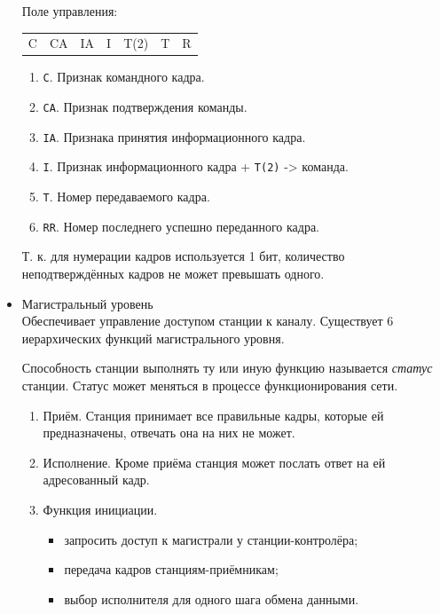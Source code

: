 \documentclass[12pt, russian, oneside, article]{ncc}
\begin{document}
\begin{itemize}
Поле управления:

\begin{center}
\begin{tabular}{lllllll}
 C  &  CA  &  IA  &  I  &  T(2)  &  T  &  R  \\
\end{tabular}
\end{center}



\begin{enumerate}
\item \texttt{С}. Признак командного кадра.
\item \texttt{CA}. Признак подтверждения команды.
\item \texttt{IA}. Признака принятия информационного кадра.
\item \texttt{I}. Признак информационного кадра + \texttt{T(2)} -> команда.
\item \texttt{T}. Номер передаваемого кадра.
\item \texttt{RR}. Номер последнего успешно переданного кадра.
\end{enumerate}

Т. к. для нумерации кадров используется 1 бит, количество неподтверждённых кадров не может превышать одного.


\item Магистральный уровень\\
\label{sec-5_2_3_3}%
Обеспечивает управление доступом станции к каналу. Существует 6 иерархических функций магистрального уровня.

Способность станции выполнять ту или иную функцию называется \emph{статус} станции. Статус может меняться в процессе функционирования сети.

\begin{enumerate}
\item Приём. Станция принимает все правильные кадры, которые ей предназначены, отвечать она на них не может.
\item Исполнение. Кроме приёма станция может послать ответ на ей адресованный кадр.
\item Функция инициации.

\begin{itemize}
\item запросить доступ к магистрали у станции-контролёра;
\item передача кадров станциям-приёмникам;
\item выбор исполнителя для одного шага обмена данными.
\end{itemize}


\end{enumerate}
\end{itemize}
\end{document}
